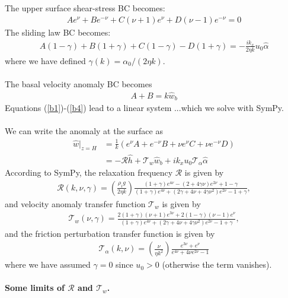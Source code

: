 \documentclass[paper=a4, fontsize=11pt]{article}
\begin{document}
The upper surface shear-stress BC becomes:
\begin{align}
A e^{\nu} + B e^{-\nu} + C(\nu+1) e^{\nu} +D(\nu-1) e^{-\nu} =  0
\end{align}
The sliding law BC becomes:
\begin{align}
{A(1-\gamma)} + {B(1+\gamma)} + {C(1-\gamma)}  - {D(1+\gamma)} = -\frac{ ik_x }{2\eta k}u_0\widehat{\alpha}
\end{align}
where we have defined $\gamma(k) = \alpha_0/(2\eta k)$. \\
\\ The basal velocity anomaly BC becomes
\begin{align}
{A} + {B}  = k\widehat{w}_b \label{b4}
\end{align}
Equations (\ref{b1})-(\ref{b4}) lead to a linear system
...which we solve with SymPy.\\ \\
We can write the anomaly at the surface as
\begin{align}
\widehat{w}|_{z=H} &= \frac{1}{k}\left(e^{\nu} A + { e^{-\nu}}B + \nu e^{\nu} C + {\nu}{ e^{-\nu}} D\right) \\
&= -\mathcal{R}\widehat{h} + \mathcal{T}_w\widehat{w}_b  +ik_x u_0  \mathcal{T}_{\alpha}  \widehat{\alpha}\label{wRT}
\end{align}
According to SymPy, the relaxation frequency $\mathcal{R}$ is given by
\begin{align}
\mathcal{R}(k,\nu,\gamma) = \left(\frac{\rho_i g }{2\eta k}\right)\frac{ (1+\gamma)e^{4\nu} -(2+4\gamma\nu)e^{2\nu} +1-\gamma  }{ (1+\gamma)e^{4\nu} + (2\gamma+4\nu+4\gamma\nu^2)e^{2\nu} -1 + \gamma  },
\end{align}
and velocity anomaly transfer function $\mathcal{T}_w$ is given by
\begin{align}
\mathcal{T}_w(\nu,\gamma) = \frac{2(1+\gamma)(\nu+1)e^{3\nu}+2(1-\gamma)(\nu-1)e^{\nu}  }{(1+\gamma)e^{4\nu} + (2\gamma+4\nu+4\gamma\nu^2)e^{2\nu} -1 + \gamma },
\end{align}
and the friction perturbation transfer function is given by
\begin{align}
\mathcal{T}_{\alpha}(k,\nu) =  \left(\frac{\nu}{\eta k^2}\right) \frac{e^{3\nu} + e^{\nu}}{e^{4\nu} +4\nu e^{2\nu} -1 }
\end{align}
where we have assumed $\gamma=0$  since $u_0>0$ (otherwise the term vanishes).
 \\ \\ \newpage
\noindent\textbf{Some limits of $\mathcal{R}$ and $\mathcal{T}_w$.}\\
\end{document}
